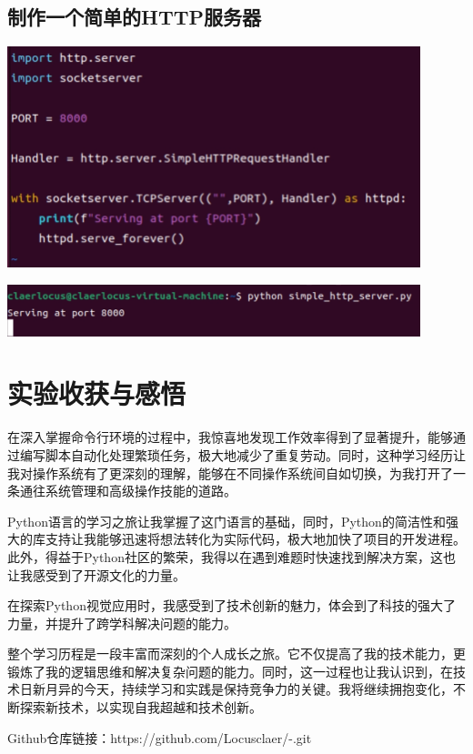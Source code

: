 \documentclass[UTF8,a4paper]{ctexart}
\begin{document}
\begin{sloppypar}
	\subsection{制作一个简单的HTTP服务器}
	
	\includegraphics[width = 12cm]{32.1}
	
	\includegraphics[width = 12cm]{32.2}
	
	\section{实验收获与感悟}
	在深入掌握命令行环境的过程中，我惊喜地发现工作效率得到了显著提升，能够通过编写脚本自动化处理繁琐任务，极大地减少了重复劳动。同时，这种学习经历让我对操作系统有了更深刻的理解，能够在不同操作系统间自如切换，为我打开了一条通往系统管理和高级操作技能的道路。
	
	Python语言的学习之旅让我掌握了这门语言的基础，同时，Python的简洁性和强大的库支持让我能够迅速将想法转化为实际代码，极大地加快了项目的开发进程。此外，得益于Python社区的繁荣，我得以在遇到难题时快速找到解决方案，这也让我感受到了开源文化的力量。
	
	在探索Python视觉应用时，我感受到了技术创新的魅力，体会到了科技的强大了力量，并提升了跨学科解决问题的能力。
	
	整个学习历程是一段丰富而深刻的个人成长之旅。它不仅提高了我的技术能力，更锻炼了我的逻辑思维和解决复杂问题的能力。同时，这一过程也让我认识到，在技术日新月异的今天，持续学习和实践是保持竞争力的关键。我将继续拥抱变化，不断探索新技术，以实现自我超越和技术创新。
	
	Github仓库链接：https://github.com/Locusclaer/-.git
	
\end{sloppypar}
\end{document}

